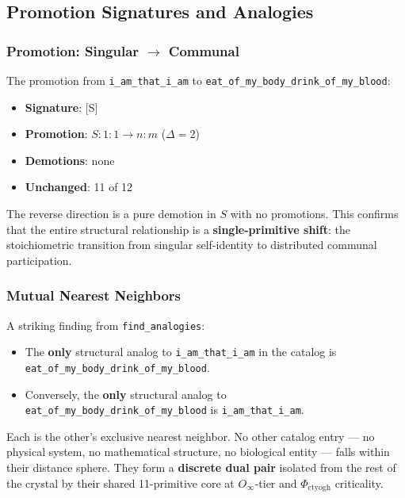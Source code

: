 \documentclass[12pt,a4paper]{article}
\begin{document}
\subsection{Promotion Signatures and Analogies}

\subsubsection{Promotion: Singular $\rightarrow$ Communal}

The promotion from \texttt{i\_am\_that\_i\_am} to \texttt{eat\_of\_my\_body\_drink\_of\_my\_blood}:

\begin{itemize}
    \item \textbf{Signature}: {[}S{]}
    \item \textbf{Promotion}: $S: 1{:}1 \to n{:}m$ ($\Delta = 2$)
    \item \textbf{Demotions}: none
    \item \textbf{Unchanged}: 11 of 12
\end{itemize}

The reverse direction is a pure demotion in $S$ with no promotions. This confirms that the entire structural relationship is a \textbf{single-primitive shift}: the stoichiometric transition from singular self-identity to distributed communal participation.

\subsubsection{Mutual Nearest Neighbors}

A striking finding from \texttt{find\_analogies}:

\begin{itemize}
    \item The \textbf{only} structural analog to \texttt{i\_am\_that\_i\_am} in the catalog is \texttt{eat\_of\_my\_body\_drink\_of\_my\_blood}.
    \item Conversely, the \textbf{only} structural analog to \texttt{eat\_of\_my\_body\_drink\_of\_my\_blood} is \texttt{i\_am\_that\_i\_am}.
\end{itemize}

Each is the other's exclusive nearest neighbor. No other catalog entry --- no physical system, no mathematical structure, no biological entity --- falls within their distance sphere. They form a \textbf{discrete dual pair} isolated from the rest of the crystal by their shared 11-primitive core at $O_{\infty}$-tier and $\Phi_{\text{ctyogh}}$ criticality.
\end{document}
